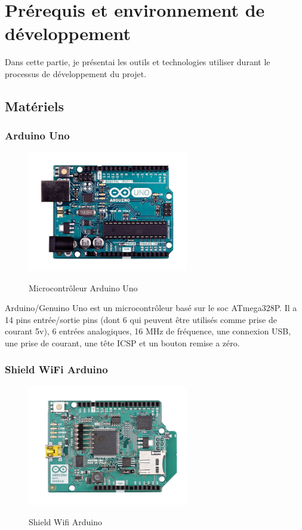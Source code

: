 \section{Prérequis et environnement de développement}
Dans cette partie, je présentai les outils et technologies utiliser durant le processus de développement du projet.\\

\subsection{Matériels}

\subsubsection{Arduino Uno}

\begin{figure}[H]
  \centering
  \href{https://www.arduino.cc/en/main/arduinoBoardUno}{
  \includegraphics[width=7cm]{image/arduino_uno.jpg}
    }
  \caption{Microcontrôleur Arduino Uno}
\end{figure}

Arduino/Genuino Uno est un microcontrôleur  basé sur le soc ATmega328P. Il a 14 pins entrée/sortie pins (dont 6 qui peuvent être utilisés comme prise de courant 5v), 6 entrées analogiques, 16 MHz de fréquence, une connexion USB, une prise de courant, une tête ICSP et un bouton remise a zéro.\\

\subsubsection{Shield WiFi Arduino}

\begin{figure}[H]
  \centering
  \href{https://www.arduino.cc/en/Main/ArduinoWiFiShield}{
  \includegraphics[width=7cm]{image/arduino_wifi.jpg}
  }
  \caption{Shield Wifi Arduino}
\end{figure}

